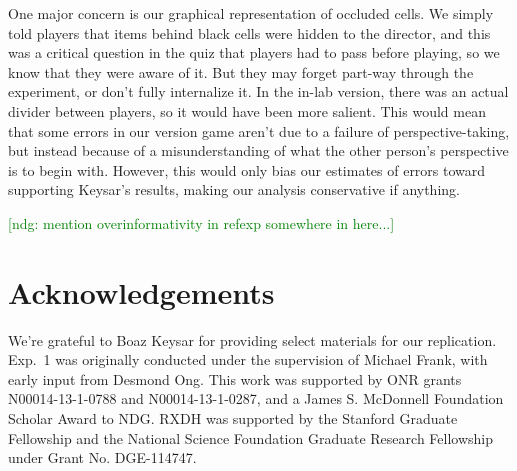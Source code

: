 \documentclass[10pt,letterpaper]{article}
\newcommand{\ndg}[1]{\textcolor{Green}{[ndg: #1]}}
\begin{document}

One major concern is our graphical representation of occluded cells. We simply told players that items behind black cells were hidden to the director, and this was a critical question in the quiz that players had to pass before playing, so we know that they were aware of it. But they may forget part-way through the experiment, or don't fully internalize it. In the in-lab version, there was an actual divider between players, so it would have been more salient. This would mean that some errors in our version game aren't due to a failure of perspective-taking, but instead because of a misunderstanding of what the other person's perspective is to begin with. However, this would only bias our estimates of errors toward supporting Keysar's results, making our analysis conservative if anything. 


\ndg{mention overinformativity in refexp somewhere in here...}

\section{Acknowledgements}

\small We're grateful to Boaz Keysar for providing select materials for our replication. Exp.~1 was originally conducted under the supervision of Michael Frank, with early input from Desmond Ong. This work was supported by ONR grants N00014-13-1-0788 and N00014-13-1-0287,  and a James S. McDonnell Foundation Scholar Award to NDG. RXDH was supported by the Stanford Graduate Fellowship and the National Science Foundation Graduate Research Fellowship under Grant No. DGE-114747. 



\setlength{\bibleftmargin}{.125in}
\setlength{\bibindent}{-\bibleftmargin}


\end{document}
